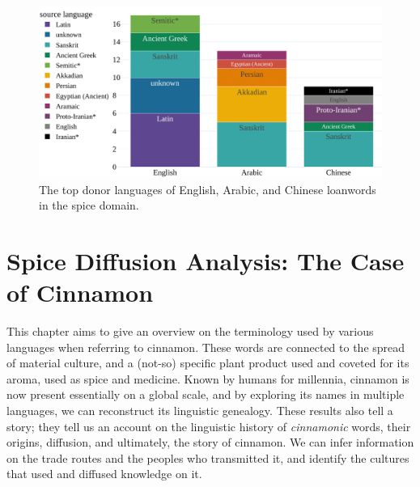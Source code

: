 \begin{figure}[!ht]
  \centering
  \includegraphics[width=\linewidth]{imgs/plots/source_bar.pdf}
  \caption{The top donor languages of English, Arabic, and Chinese loanwords in the spice domain.}
  \label{fig:source_bar}
\end{figure}





\section{Spice Diffusion Analysis: The Case of Cinnamon}
\label{sec:case_of_cinnamon}


This chapter aims to give an overview on the terminology used by various languages when referring to cinnamon. These words are connected to the spread of material culture, and a (not-so) specific plant product used and coveted for its aroma, used as spice and medicine. Known by humans for millennia, cinnamon is now present essentially on a global scale, and by exploring its names in multiple languages, we can reconstruct its linguistic genealogy. These results also tell a story; they tell us an account on the linguistic history of \emph{cinnamonic} words, their origins, diffusion, and ultimately, the story of cinnamon. We can infer information on the trade routes and the peoples who transmitted it, and identify the cultures that used and diffused knowledge on it. 

